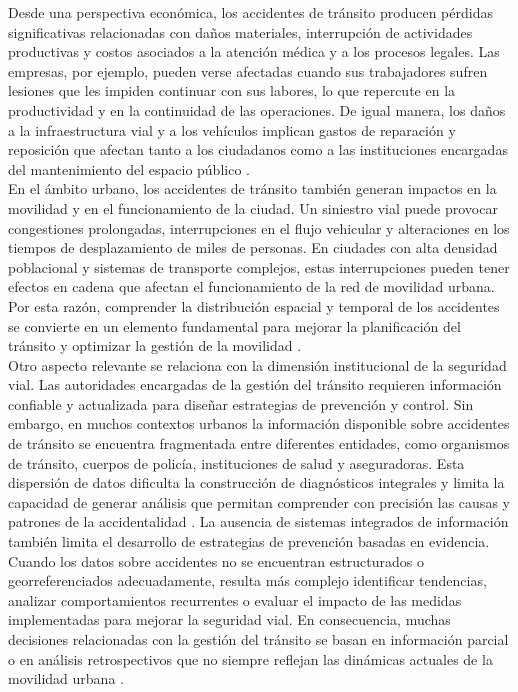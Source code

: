 Desde una perspectiva económica, los accidentes de tránsito producen pérdidas significativas relacionadas con daños materiales, interrupción de actividades productivas y costos asociados a la atención médica y a los procesos legales. Las empresas, por ejemplo, pueden verse afectadas cuando sus trabajadores sufren lesiones que les impiden continuar con sus labores, lo que repercute en la productividad y en la continuidad de las operaciones. De igual manera, los daños a la infraestructura vial y a los vehículos implican gastos de reparación y reposición que afectan tanto a los ciudadanos como a las instituciones encargadas del mantenimiento del espacio público \cite{chavez2024}.\\
En el ámbito urbano, los accidentes de tránsito también generan impactos en la movilidad y en el funcionamiento de la ciudad. Un siniestro vial puede provocar congestiones prolongadas, interrupciones en el flujo vehicular y alteraciones en los tiempos de desplazamiento de miles de personas. En ciudades con alta densidad poblacional y sistemas de transporte complejos, estas interrupciones pueden tener efectos en cadena que afectan el funcionamiento de la red de movilidad urbana. Por esta razón, comprender la distribución espacial y temporal de los accidentes se convierte en un elemento fundamental para mejorar la planificación del tránsito y optimizar la gestión de la movilidad \cite{betancourt2021}.\\
Otro aspecto relevante se relaciona con la dimensión institucional de la seguridad vial. Las autoridades encargadas de la gestión del tránsito requieren información confiable y actualizada para diseñar estrategias de prevención y control. Sin embargo, en muchos contextos urbanos la información disponible sobre accidentes de tránsito se encuentra fragmentada entre diferentes entidades, como organismos de tránsito, cuerpos de policía, instituciones de salud y aseguradoras. Esta dispersión de datos dificulta la construcción de diagnósticos integrales y limita la capacidad de generar análisis que permitan comprender con precisión las causas y patrones de la accidentalidad \cite{ortiz2024}.
La ausencia de sistemas integrados de información también limita el desarrollo de estrategias de prevención basadas en evidencia. Cuando los datos sobre accidentes no se encuentran estructurados o georreferenciados adecuadamente, resulta más complejo identificar tendencias, analizar comportamientos recurrentes o evaluar el impacto de las medidas implementadas para mejorar la seguridad vial. En consecuencia, muchas decisiones relacionadas con la gestión del tránsito se basan en información parcial o en análisis retrospectivos que no siempre reflejan las dinámicas actuales de la movilidad urbana \cite{oviedo2025}.\\
